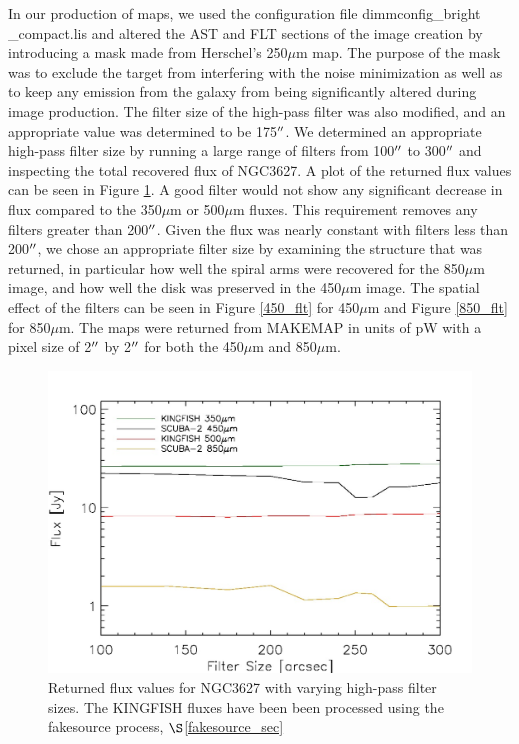 In our production of maps, we used the configuration file dimmconfig\_bright \_compact.lis and altered the AST and FLT sections of the image creation by introducing a mask made from Herschel's 250$\mu$m map.  The purpose of the mask was to exclude the target from interfering with the noise minimization as well as to keep any emission from the galaxy from being significantly altered during image production.  The filter size of the high-pass filter was also modified, and an appropriate value was determined to be 175$\mbox{$^{\prime\prime}$}$.  We determined an appropriate high-pass filter size by running a large range of filters from 100$\mbox{$^{\prime\prime}$}$ to 300$\mbox{$^{\prime\prime}$}$ and inspecting the total recovered flux of NGC3627.  A plot of the returned flux values can be seen in Figure \ref{filt_lines}.  A good filter would not show any significant decrease in flux compared to the 350$\mu$m or 500$\mu$m fluxes.  This requirement removes any filters greater than 200$\mbox{$^{\prime\prime}$}$.  Given the flux was nearly constant with filters less than 200$\mbox{$^{\prime\prime}$}$, we chose an appropriate filter size by examining the structure that was returned, in particular how well the spiral arms were recovered for the 850$\mu$m image, and how well the disk was preserved in the 450$\mu$m image.  The spatial effect of the filters can be seen in Figure \ref{450_flt} for 450$\mu$m and Figure \ref{850_flt} for 850$\mu$m.  The maps were returned from MAKEMAP in units of pW with a pixel size of 2$\mbox{$^{\prime\prime}$}$ by 2$\mbox{$^{\prime\prime}$}$ for both the 450$\mu$m and 850$\mu$m.

\begin{figure}
  \centering
  \includegraphics[scale=0.65]{obs_imgs/flux_line.jpeg}
  \caption[Flux Values vs  High-Pass Filter Sizes]{Returned flux values for NGC3627 with varying high-pass filter sizes.  The KINGFISH fluxes have been been processed using the fakesource process, $\S$\ref{fakesource_sec}}
  \label{filt_lines}
\end{figure}

